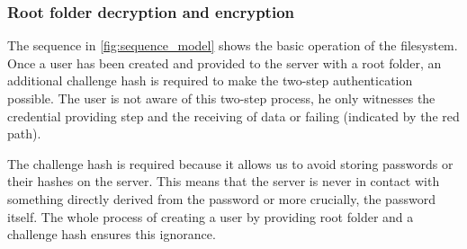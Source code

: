 \subsubsection{Root folder decryption and encryption}
The sequence in \autoref{fig:sequence_model} shows the basic operation of the filesystem. Once a user has been created and provided to the server with a root folder, an additional challenge hash is required to make the two-step authentication possible. The user is not aware of this two-step process, he only witnesses the credential providing step and the receiving of data or failing (indicated by the red path).

The challenge hash is required because it allows us to avoid storing passwords or their hashes on the server. This means that the server is never in contact with something directly derived from the password or more crucially, the password itself. The whole process of creating a user by providing root folder and a challenge hash ensures this ignorance. 